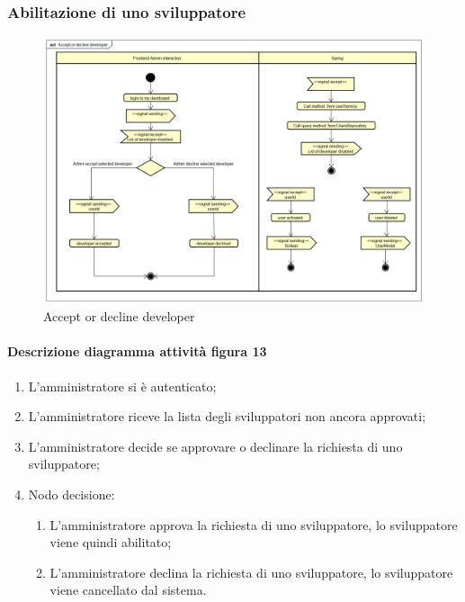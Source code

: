 \subsubsection{Abilitazione di uno sviluppatore}
\begin{figure}[H]
\centering
\includegraphics[width=17cm, keepaspectratio]{img/Accept-or-decline-developer.png} 
\caption{Accept or decline developer}
\end{figure}

\paragraph{Descrizione diagramma attività figura 13}
\begin{enumerate}
\item L'amministratore si è autenticato;
\item L'amministratore riceve la lista degli sviluppatori non ancora approvati; 
\item L'amministratore decide se approvare o declinare la richiesta di uno sviluppatore; 
\item Nodo decisione:
\begin{enumerate}
	\item L'amministratore approva la richiesta di uno sviluppatore, lo sviluppatore viene quindi abilitato;
	\item L'amministratore declina la richiesta di uno sviluppatore, lo sviluppatore viene cancellato dal sistema. 
\end{enumerate}
\end{enumerate}



